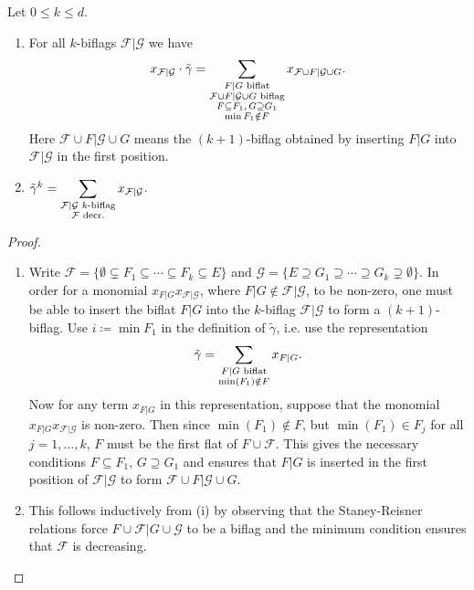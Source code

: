 \documentclass[12pt,a4paper,english]{scrartcl}
\begin{document}
\begin{lemma}
\label{lem:expandinggamma}
Let $0\leq k \leq d$.
\begin{enumerate}
\item For all $k$-biflags $\mathcal{F}|\mathcal{G}$ we have
\[
x_{\mathcal{F}|\mathcal{G}} \cdot \tilde{\gamma} = \sum_{\substack{F|G \textup{ biflat} \\ \mathcal{F}\cup F|\mathcal{G}\cup G \textup{ biflag} \\F \subseteq F_1,\,G\supseteq G_1\\ \min F_1 \notin F}} x_{\mathcal{F}\cup F|\mathcal{G}\cup G}.
\]
Here $\mathcal{F}\cup F|\mathcal{G}\cup G$ means the $(k+1)$-biflag obtained by inserting $F|G$ into $\mathcal{F}|\mathcal{G}$ in the first position.
\item $\tilde{\gamma}^k = \displaystyle \sum_{\substack{
    \mathcal{F}|\mathcal{G} \textup{ $k$-biflag}\\
    \mathcal{F} \textup{ decr.}
}} x_{\mathcal{F}|\mathcal{G}}$.
\end{enumerate}
\end{lemma}

\begin{proof}
\begin{enumerate}[wide]
\item Write $\mathcal{F}=\{\emptyset\subsetneq F_1\subseteq \cdots \subseteq F_k\subseteq E\}$ and $\mathcal{G}=\{E\supseteq G_1\supseteq \cdots \supseteq G_k\supsetneq \emptyset\}$. In order for a monomial $x_{F|G}x_{\mathcal{F}|\mathcal{G}}$, where $F|G\notin \mathcal{F}|\mathcal{G}$, to be non-zero, one must be able to insert the biflat $F|G$ into the $k$-biflag $\mathcal{F}|\mathcal{G}$ to form a $(k+1)$-biflag. Use $i \coloneq \min F_1$ in the definition of $\tilde{\gamma}$, i.e. use the representation \[
\tilde{\gamma} = \sum_{\substack{F|G \textup{ biflat}\\ \min(F_1) \notin F}} x_{F|G}.
\] Now for any term $x_{F|G}$ in this representation, suppose that the monomial $x_{F|G}x_{\mathcal{F}|\mathcal{G}}$ is non-zero. Then since $\min(F_1) \notin F$, but $\min(F_1)\in F_j$ for all $j=1,\ldots,k$, $F$ must be the first flat of $F \cup \mathcal{F}$. This gives the necessary conditions $F \subseteq F_1$, $G \supseteq G_1$ and ensures that $F|G$ is inserted in the first position of $\mathcal{F}|\mathcal{G}$ to form $\mathcal{F}\cup F|\mathcal{G}\cup G$.  

\item This follows inductively from (i) by observing that the Staney-Reisner relations force $F \cup \mathcal{F}|G\cup \mathcal{G}$ to be a biflag and the minimum condition ensures that $\mathcal{F}$ is decreasing.
\end{enumerate}
\end{proof}
\end{document}
